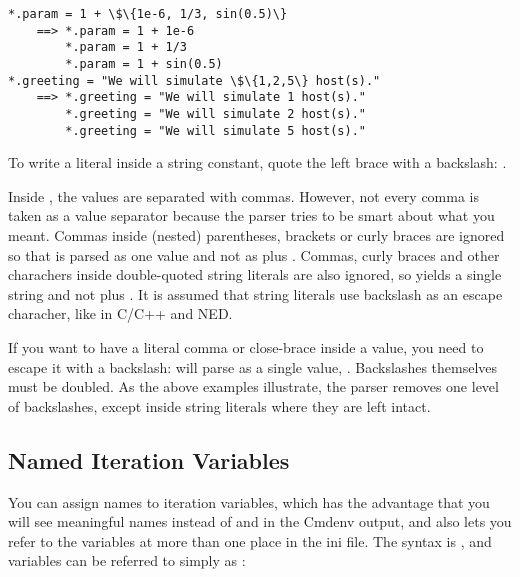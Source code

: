 \begin{Verbatim}[commandchars=\\\{\}]
*.param = 1 + \$\{1e-6, 1/3, sin(0.5)\}
    ==> *.param = 1 + 1e-6
        *.param = 1 + 1/3
        *.param = 1 + sin(0.5)
*.greeting = "We will simulate \$\{1,2,5\} host(s)."
    ==> *.greeting = "We will simulate 1 host(s)."
        *.greeting = "We will simulate 2 host(s)."
        *.greeting = "We will simulate 5 host(s)."
\end{Verbatim}

To write a literal  inside a string constant, quote
the left brace with a backslash: .

\begin{note}
Inside , the values are separated with commas. However,
not every comma is taken as a value separator because the parser
tries to be smart about what you meant. Commas inside (nested) parentheses,
brackets or curly braces are ignored so that  is
parsed as one value and not as  plus . Commas, curly
braces and other charachers inside double-quoted string literals are
also ignored, so  yields a single 
string and not  plus . It is assumed that string literals
use backslash as an escape characher, like in C/C++ and NED.

If you want to have a literal comma or close-brace inside a value, you need
to escape it with a backslash: 
will parse as a single value, . Backslashes themselves must be doubled.
As the above examples illustrate, the parser removes one level of backslashes,
except inside string literals where they are left intact.
\end{note}


\subsection{Named Iteration Variables}
\label{sec:config-sim:named-iteration-variables}

You can assign names to iteration variables, which has the advantage
that you will see meaningful names instead of  and
 in the Cmdenv output, and also lets you refer to the variables at
more than one place in the ini file. The syntax is
, and variables can be referred to simply as
:

